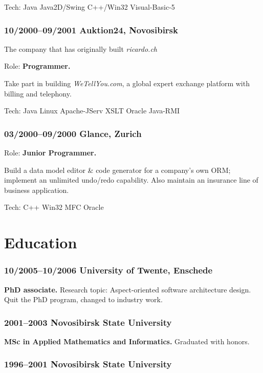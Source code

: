 \documentclass[a4paper, twocolumn, 10pt]{article}
\begin{document}
Tech: Java Java2D/Swing C++/Win32 Visual-Basic-5

\subsubsection*{10/2000--09/2001 Auktion24, Novosibirsk}

The company that has originally built \emph{ricardo.ch}

Role: \textbf{Programmer.}

Take part in building \emph{WeTellYou.com}, a global expert exchange platform with billing and telephony.

Tech: Java Linux Apache-JServ XSLT Oracle Java-RMI

\subsubsection*{03/2000--09/2000 Glance, Zurich}

Role: \textbf{Junior Programmer.}

Build a data model editor \& code generator for a company's own ORM; implement an unlimited
undo/redo capability. Also maintain an insurance line of business application.

Tech: C++ Win32 MFC Oracle

\section*{Education}

\subsubsection*{10/2005--10/2006 University of Twente, Enschede}

\textbf{PhD associate.} Research topic: Aspect-oriented software architecture design. Quit the PhD
program, changed to industry work.

\subsubsection*{2001--2003 Novosibirsk State University}

\textbf{MSc in Applied Mathematics and Informatics.} Graduated with honors.

\subsubsection*{1996--2001 Novosibirsk State University}
\end{document}
